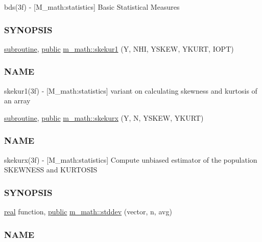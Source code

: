 \begin{DoxyCompactItemize}
\begin{DoxyCompactList}
bds(3f) -\/ \mbox{[}M\+\_\+math\+:statistics\mbox{]} Basic Statistical Measures \subsubsection*{S\+Y\+N\+O\+P\+S\+IS}\end{DoxyCompactList}\item 
\hyperlink{M__stopwatch_83_8txt_acfbcff50169d691ff02d4a123ed70482}{subroutine}, \hyperlink{M__stopwatch_83_8txt_a2f74811300c361e53b430611a7d1769f}{public} \hyperlink{namespacem__math_a386a33c25fa5142ea1c6d45d3beae042}{m\+\_\+math\+::skekur1} (Y, N\+HI, Y\+S\+K\+EW, Y\+K\+U\+RT, I\+O\+PT)
\begin{DoxyCompactList}\small\item\em \subsubsection*{N\+A\+ME}

skekur1(3f) -\/ \mbox{[}M\+\_\+math\+:statistics\mbox{]} variant on calculating skewness and kurtosis of an array \end{DoxyCompactList}\item 
\hyperlink{M__stopwatch_83_8txt_acfbcff50169d691ff02d4a123ed70482}{subroutine}, \hyperlink{M__stopwatch_83_8txt_a2f74811300c361e53b430611a7d1769f}{public} \hyperlink{namespacem__math_a7c595127392d65cef1e34cebdb49b27c}{m\+\_\+math\+::skekurx} (Y, N, Y\+S\+K\+EW, Y\+K\+U\+RT)
\begin{DoxyCompactList}\small\item\em \subsubsection*{N\+A\+ME}

skekurx(3f) -\/ \mbox{[}M\+\_\+math\+:statistics\mbox{]} Compute unbiased estimator of the population S\+K\+E\+W\+N\+E\+SS and K\+U\+R\+T\+O\+S\+IS \subsubsection*{S\+Y\+N\+O\+P\+S\+IS}\end{DoxyCompactList}\item 
\hyperlink{read__watch_83_8txt_abdb62bde002f38ef75f810d3a905a823}{real} function, \hyperlink{M__stopwatch_83_8txt_a2f74811300c361e53b430611a7d1769f}{public} \hyperlink{namespacem__math_af6b04705727dc68a6e2eeff3a0e71cf1}{m\+\_\+math\+::stddev} (vector, n, avg)
\begin{DoxyCompactList}\small\item\em \subsubsection*{N\+A\+ME}


\end{DoxyCompactList}
\end{DoxyCompactItemize}
